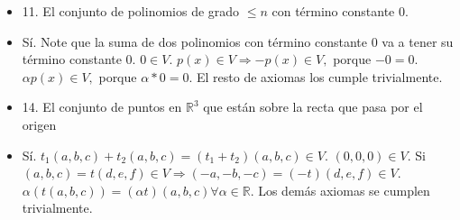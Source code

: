 \documentclass[
]{article}
\begin{document}
\begin{itemize}
\item
  11. El conjunto de polinomios de grado \(\leq n\) con término
  constante 0.
\end{itemize}

\begin{itemize}
\item
  Sí. Note que la suma de dos polinomios con término constante 0 va a
  tener su término constante 0. \(0 \in V\).
  \(p(x) \in V \Rightarrow - p(x) \in V,\) porque \(- 0 = 0\).
  \(\alpha p(x) \in V,\) porque \(\alpha*0 = 0\). El resto de axiomas
  los cumple trivialmente.
\end{itemize}

\begin{itemize}
\item
  14. El conjunto de puntos en \(\mathbb{R}^{3}\) que están sobre la
  recta que pasa por el origen
\end{itemize}

\begin{itemize}
\item
  Sí. \(t_{1}(a,b,c) + t_{2}(a,b,c) = (t_{1} + t_{2})(a,b,c) \in V\).
  \((0,0,0) \in V\). Si
  \((a,b,c) = t(d,e,f) \in V \Rightarrow ( - a, - b, - c) = ( - t)(d,e,f) \in V\).
  \(\alpha(t(a,b,c)) = (\alpha t)(a,b,c)\forall\alpha \in \mathbb{R}\).
  Los demás axiomas se cumplen trivialmente.
\end{itemize}
\end{document}
